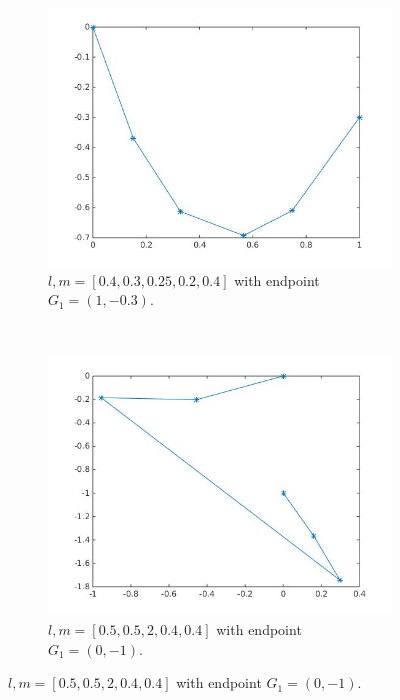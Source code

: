 \begin{figure}
        \centering
        \begin{subfigure}[b]{0.45\textwidth}
                \includegraphics[width=\textwidth]{test1.jpg}
                \caption{$l,m = [0.4,0.3,0.25,0.2,0.4]$ with endpoint $G_1 = (1,-0.3)$. }
                \label{fig:test1}
        \end{subfigure}%
        ~
        \begin{subfigure}[b]{0.45\textwidth}
                \includegraphics[width=\textwidth]{test2.jpg}
                \caption{$l,m = [0.5,0.5,2,0.4,0.4]$ with endpoint $G_1 = (0,-1)$. }
                \label{fig:test2}
        \end{subfigure}
        

\end{figure}
